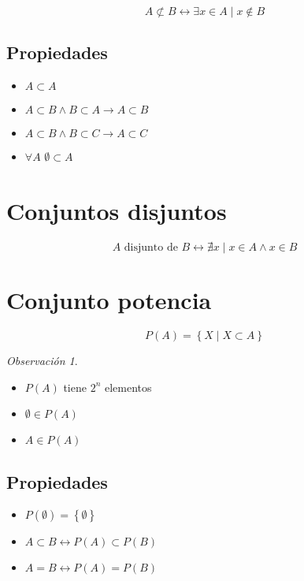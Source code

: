 \documentclass[
  16pt,
]{krantz}
\providecommand{\tightlist}{%
  \setlength{\itemsep}{0pt}\setlength{\parskip}{0pt}}
\theoremstyle{definition}
\theoremstyle{definition}
\theoremstyle{definition}
\theoremstyle{definition}
\theoremstyle{remark}
\newtheorem*{remark}{Observación}
\begin{document}
\[
A\not\subset B\leftrightarrow\exists x\in A\;|\; x\notin B
\]

\hypertarget{propiedades-1}{%
\subsection{Propiedades}\label{propiedades-1}}

\begin{itemize}
\tightlist
\item
  \(A\subset A\)
\item
  \(A\subset B\wedge B\subset A\rightarrow A\subset B\)
\item
  \(A\subset B\wedge B\subset C\rightarrow A\subset C\)
\item
  \(\forall A\) \(\emptyset\subset A\)
\end{itemize}

\hypertarget{conjuntos-disjuntos}{%
\section{Conjuntos disjuntos}\label{conjuntos-disjuntos}}

\[
A\text{ disjunto de } B\leftrightarrow\nexists x\;|\; x\in A\wedge x\in B  
\]

\hypertarget{conjunto-potencia}{%
\section{Conjunto potencia}\label{conjunto-potencia}}

\[
P(A)=\left\{X\;|\;X\subset A\right\}
\]

\begin{remark}
\iffalse{} {Observación. } \fi{}
\end{remark}

\begin{itemize}
\tightlist
\item
  \(P(A)\) tiene \(2^n\) elementos
\item
  \(\emptyset\in P(A)\)
\item
  \(A\in P(A)\)
\end{itemize}

\hypertarget{propiedades-2}{%
\subsection{Propiedades}\label{propiedades-2}}

\begin{itemize}
\tightlist
\item
  \(P(\emptyset)=\left\{\emptyset\right\}\)
\item
  \(A\subset B\leftrightarrow P(A)\subset P(B)\)
\item
  \(A= B\leftrightarrow P(A)= P(B)\)
\end{itemize}
\end{document}
